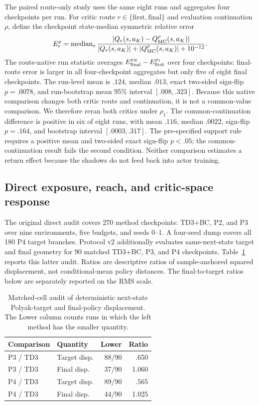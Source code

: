 \documentclass[twoside]{article}
\begin{document}
The paired route-only study uses the same eight runs and aggregates four
checkpoints per run. For critic route $r\in\{\mathrm{first},\mathrm{final}\}$
and evaluation continuation $\rho$, define the checkpoint state-median
symmetric relative error
\begin{equation}
E_r^{\rho}=\operatorname{median}_s
\frac{|Q_r(s,a_K)-Q_{\rm MC}^{\rho}(s,a_K)|}
{|Q_r(s,a_K)|+|Q_{\rm MC}^{\rho}(s,a_K)|+10^{-12}}.
\end{equation}
The route-native run statistic averages $E_{\rm final}^{\rho_K}-E_{\rm first}^{\rho_1}$ over four checkpoints: final-route error is larger in all four-checkpoint aggregates but only five of eight final checkpoints. The run-level mean is $.124$, median $.013$, exact two-sided sign-flip $p=.0078$, and run-bootstrap mean 95\% interval $[.008,.323]$.
Because this native comparison changes both critic route and continuation, it is not a common-value comparison.
We therefore reran both critics under $\rho_1$. The common-continuation difference is positive in six of eight runs, with mean $.116$, median $.0022$, sign-flip $p=.164$, and bootstrap interval $[.0003,.317]$.
The pre-specified support rule requires a positive mean and two-sided exact sign-flip $p<.05$; the common-continuation result fails the second condition. Neither comparison estimates a return effect because the shadows do not feed back into actor training.

\subsection{Direct exposure, reach, and critic-space response}

The original direct audit covers 270 method checkpoints: TD3+BC, P2, and P3
over nine environments, five budgets, and seeds 0--1. A four-seed dump covers
all 180 P4 target branches. Protocol v2 additionally evaluates same-next-state
target and final geometry for 90 matched TD3+BC, P3, and P4 checkpoints.
Table~\ref{tab:direct_exposure} reports this latter audit. Ratios are
descriptive ratios of sample-anchored squared displacement, not
conditional-mean policy distances. The final-to-target ratios below are
separately reported on the RMS scale.

\begin{table}[t]
\caption{Matched-cell audit of deterministic next-state Polyak-target and
final-policy displacement. The Lower column counts runs in
which the left method has the smaller quantity.}
\centering
\small
\begin{tabular}{@{}llrr@{}}
\toprule
Comparison & Quantity & Lower & Ratio\\
\midrule
P3 / TD3 & Target disp. & 88/90 & .650\\
P3 / TD3 & Final disp. & 37/90 & 1.060\\
P4 / TD3 & Target disp. & 89/90 & .565\\
P4 / TD3 & Final disp. & 44/90 & 1.025\\
\bottomrule
\end{tabular}
\label{tab:direct_exposure}
\end{table}
\end{document}
